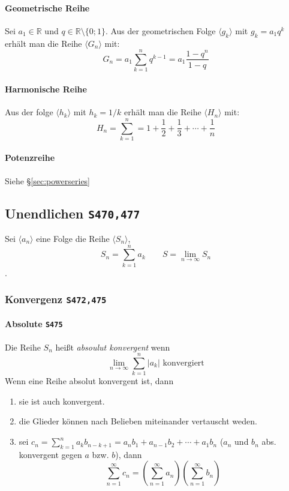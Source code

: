 \documentclass[a4paper, twocolumn]{article}
\numberwithin{equation}{subsection}
\newcommand{\brpage}[1]{\textcolor{red!70!black}{\small\texttt{S#1}}}
\begin{document}
\paragraph{Geometrische Reihe}
Sei \(a_1 \in \mathbb{R}\) und \(q \in \mathbb{R} \setminus \{0;1\}\). Aus der geometrischen Folge \(\langle g_k \rangle\) mit \(g_k = a_1 q^k\) erh\"alt man die Reihe \(\langle G_n \rangle\) mit:
\[
    G_n = a_1 \sum_{k=1}^n q^{k-1} = a_1 \frac{1-q^n}{1-q}
\]
    
\paragraph{Harmonische Reihe}
Aus der folge \(\langle h_k \rangle\) mit \(h_k = 1/k\) erh\"alt man die Reihe \(\langle H_n \rangle\) mit:
\[
    H_n = \sum_{k=1}^n = 1 + \frac{1}{2} + \frac{1}{3} + \cdots + \frac{1}{n}
\]

\paragraph{Potenzreihe} Siehe \S\ref{sec:powerseries}

\subsection{Unendlichen \brpage{470,477}}
Sei \(\langle a_n \rangle\) eine Folge die Reihe \(\langle S_n \rangle\),
\[
    S_n = \sum_{k=1}^n a_k \qquad S = \lim_{n\to\infty} S_n
\].

\subsubsection{Konvergenz \brpage{472,475}}

\paragraph{Absolute \brpage{475}}
Die Reihe \(S_n\) hei{\ss}t \emph{absoulut konvergent} wenn
\[
    \lim_{n\to\infty} \sum_{k=1}^n \left| a_k \right| \text{ konvergiert}
\]
Wenn eine Reihe absolut konvergent ist, dann
\begin{enumerate}
    \item sie ist auch konvergent.
    \item die Glieder k\"onnen nach Belieben miteinander vertauscht weden.
    \item sei \(\displaystyle 
        c_n = \sum_{k=1}^n a_k b_{n-k+1} = a_n b_1 + a_{n-1} b_2 + \cdots + a_1 b_n
    \) (\(a_n\) und \(b_n\) abs. konvergent gegen \(a\) bzw. \(b\)), dann
    \[
        \sum_{n=1}^\infty c_n = 
        \left(\sum_{n=1}^\infty a_n\right)
        \left(\sum_{n=1}^\infty b_n\right)
    \]
\end{enumerate}
\end{document}
